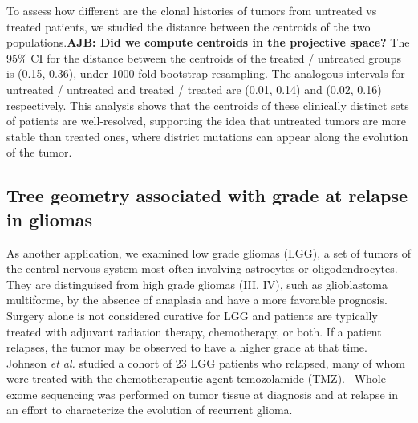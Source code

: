 \documentclass[a4paper,11pt]{article}
\begin{document}
To assess how different are the clonal histories of tumors from
untreated vs treated patients, we studied the distance between the
centroids of the two populations.{\bf AJB: Did we compute centroids in
  the projective space?}
The 95\% CI for the distance between the centroids of the treated / untreated groups is (0.15, 0.36), under 1000-fold bootstrap resampling.
The analogous intervals for untreated / untreated and treated / treated are (0.01, 0.14) and (0.02, 0.16) respectively.
This analysis shows that the centroids of these clinically distinct sets of patients are well-resolved, supporting the idea that untreated tumors are more stable than treated ones, where district mutations can appear along the evolution of the tumor.

\subsection{Tree geometry associated with grade at relapse in gliomas}\label{sec:glioma}

As another application, we examined low grade gliomas (LGG), a set of tumors of the central nervous system most often involving astrocytes or oligodendrocytes.
They are distinguised from high grade gliomas (III, IV), such as glioblastoma multiforme, by the absence of anaplasia and have a more favorable prognosis.
Surgery alone is not considered curative for LGG and patients are typically treated with adjuvant radiation therapy, chemotherapy, or both.
If a patient relapses, the tumor may be observed to have a higher grade at that time.
Johnson \textit{et al.} studied a cohort of 23 LGG patients who relapsed, many of whom were treated with the chemotherapeutic agent temozolamide (TMZ).~\cite{johnson2014mutational}
Whole exome sequencing was performed on tumor tissue at diagnosis and at relapse in an effort to characterize the evolution of recurrent glioma.
\end{document}
